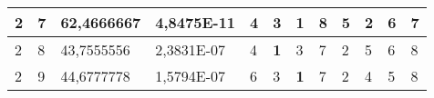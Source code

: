 \documentclass[conference]{IEEEtran}
\begin{document}
\begin{table*}[]
\begin{tabular}{|llll|llllllll|}
\multicolumn{1}{|l|}{2}                                                     & \multicolumn{1}{l|}{7}                                                        & \multicolumn{1}{l|}{62,4666667}                                                   & 4,8475E-11                     & \multicolumn{1}{l|}{4}                                                  & \multicolumn{1}{l|}{3}                                                  & \multicolumn{1}{l|}{\textbf{1}}                                         & \multicolumn{1}{l|}{8}                                                  & \multicolumn{1}{l|}{5}                                                  & \multicolumn{1}{l|}{2}                                                  & \multicolumn{1}{l|}{6}                                                  & 7                          \\ \hline
\multicolumn{1}{|l|}{2}                                                     & \multicolumn{1}{l|}{8}                                                        & \multicolumn{1}{l|}{43,7555556}                                                   & 2,3831E-07                     & \multicolumn{1}{l|}{4}                                                  & \multicolumn{1}{l|}{\textbf{1}}                                         & \multicolumn{1}{l|}{3}                                                  & \multicolumn{1}{l|}{7}                                                  & \multicolumn{1}{l|}{2}                                                  & \multicolumn{1}{l|}{5}                                                  & \multicolumn{1}{l|}{6}                                                  & 8                          \\ \hline
\multicolumn{1}{|l|}{2}                                                     & \multicolumn{1}{l|}{9}                                                        & \multicolumn{1}{l|}{44,6777778}                                                   & 1,5794E-07                     & \multicolumn{1}{l|}{6}                                                  & \multicolumn{1}{l|}{3}                                                  & \multicolumn{1}{l|}{\textbf{1}}                                         & \multicolumn{1}{l|}{7}                                                  & \multicolumn{1}{l|}{2}                                                  & \multicolumn{1}{l|}{4}                                                  & \multicolumn{1}{l|}{5}                                                  & 8                          \\ \hline

\end{tabular}
\end{table*}
\end{document}

